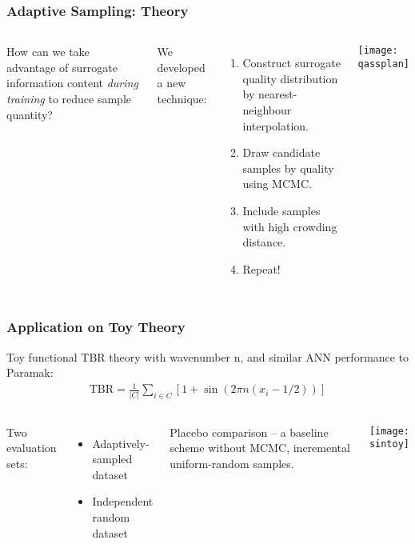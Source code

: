 \begin{frame}
	\frametitle{Adaptive Sampling: Theory}
	 \begin{columns}[onlytextwidth,T]
      \column{\dimexpr\linewidth-6cm-5mm}
        
        How can we take advantage of surrogate information content \textit{during training} to reduce sample quantity?\newline
        
        We developed a new technique:
        \vspace{-5pt}
        \begin{enumerate}
        \item Construct surrogate quality distribution by nearest- neighbour interpolation.
        \item Draw candidate samples by quality using MCMC.
        \item Include samples with high crowding distance.
        \item Repeat!
        \end{enumerate}
      \column{6cm}
      \texttt{[image: qassplan]}

    \end{columns}
\end{frame}

\begin{frame}
	\frametitle{Application on Toy Theory}
	Toy functional TBR theory with wavenumber n, and similar ANN performance to Paramak:
	\begin{align*}
		\text{TBR} = \frac{1}{|C|}\sum_{i \in C} \left[1 + \sin(2\pi n (x_i - 1/2)) \right]
	\end{align*}

	\vspace{1em}

	\begin{columns}[T]
		\column{0.5\paperwidth}
		\vspace{0.5em}
		Two evaluation sets:
		\begin{itemize}
		    \item Adaptively-sampled dataset
		    \item Independent random dataset
		\end{itemize}
		\vspace{15pt}

		Placebo comparison -- a baseline scheme without MCMC, incremental uniform-random samples.


		\column{0.4\paperwidth}
		\texttt{[image: sintoy]}

	\end{columns}
\end{frame}


